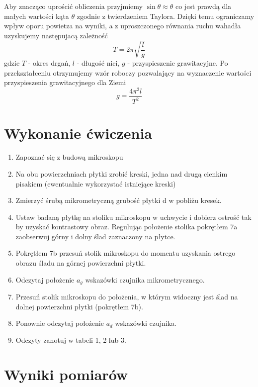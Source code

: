 \documentclass[a4paper,10pt,twoside]{article}
\begin{document}
	Aby znacząco uprościć obliczenia przyjmiemy $\sin\theta\approx\theta$ co jest prawdą dla małych wartości kąta $\theta$ zgodnie z
	twierdzeniem Taylora. Dzięki temu ograniczamy wpływ oporu powietza na wyniki, a z uproszczonego równania ruchu wahadła
	uzyskujemy następujacą zależność
	\begin{equation}
	T=2\pi\sqrt{\frac{l}{g}}
	\end{equation}
	gdzie $T$ - okres drgań, $l$ - długość nici, $g$ - przyspieszenie grawitacyjne. Po przekształceniu otrzymujemy wzór roboczy pozwalający
	na wyznaczenie wartości przyspieszenia grawitacyjnego dla Ziemi
	\begin{equation}
	\label{eq:working_g}
	g=\frac{4\pi^2l}{T^2}
	\end{equation}
	\newpage
	\section{Wykonanie ćwiczenia}
	
	\begin{enumerate}
		\item Zapoznać się z budową mikroskopu
		\item Na obu powierzchniach płytki zrobić kreski, jedna nad drugą cienkim pisakiem (ewentualnie wykorzystać istniejące kreski)
		\item Zmierzyć śrubą
		mikrometryczną
		grubość płytki d w pobliżu kresek. 
		\item Ustaw  badaną
		płytkę
		na  stoliku  mikroskopu  w  uchwycie  i  dobierz  ostrość
		tak  by  uzyskać
		kontrastowy obraz. Regulując położenie stolika pokrętłem 7a zaobserwuj górny i dolny 
		ślad zaznaczony na płytce. 
		\item Pokrętłem 7b przesuń stolik mikroskopu do momentu uzyskania ostrego obrazu śladu na górnej powierzchni płytki.
		\item Odczytaj położenie $a_g$ wskazówki czujnika mikrometrycznego. 
		\item Przesuń stolik mikroskopu do położenia, w którym widoczny jest ślad na dolnej powierzchni płytki (pokrętłem 7b). 
		\item Ponownie odczytaj położenie $a_d$ wskazówki czujnika.
		\item Odczyty zanotuj w tabeli 1, 2 lub 3.
	\end{enumerate}

	
	\section{Wyniki pomiarów}
	
\end{document}
